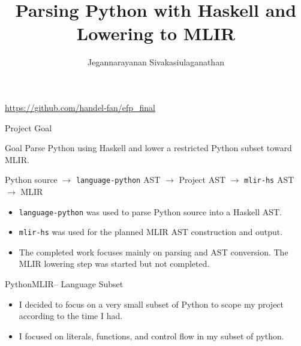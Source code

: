 \documentclass[aspectratio=169,11pt]{beamer}
\title{Parsing Python with Haskell and Lowering to MLIR}
\author{Jegannarayanan Sivakasiulaganathan}
\date{}
\begin{document}
\begin{frame}
	\titlepage
	\vspace{-0.4cm}
	\begin{center}
		\small \url{https://github.com/handel-fan/efp_final}
	\end{center}
\end{frame}

\begin{frame}{Project Goal}
	\begin{block}{Goal}
		Parse Python using Haskell and lower a restricted Python subset toward MLIR.
	\end{block}

	\vspace{0.25cm}
	\centering
	\Large
	Python source $\rightarrow$ \texttt{language-python} AST $\rightarrow$ Project AST $\rightarrow$ \texttt{mlir-hs} AST $\rightarrow$ MLIR

	\vspace{0.35cm}
	\normalsize
	\begin{itemize}
		\item \texttt{language-python} was used to parse Python source into a Haskell AST.
		\item \texttt{mlir-hs} was used for the planned MLIR AST construction and output.
		\item The completed work focuses mainly on parsing and AST conversion. The MLIR
		      lowering step was started but not completed.
	\end{itemize}
\end{frame}

\begin{frame}{PythonMLIR-- Language Subset}
	\begin{itemize}
		\item I decided to focus on a very small subset of Python to scope my project
		      according to the time I had.
		\item I focused on literals, functions, and control flow in my subset of python.
	\end{itemize}

	\vspace{0.35cm}
\end{frame}
\end{document}
